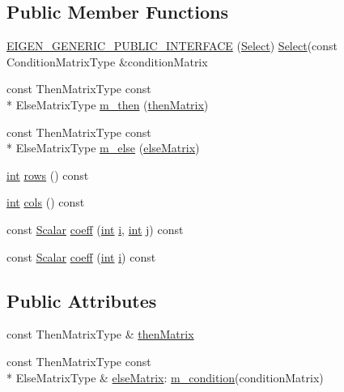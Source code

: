 \subsection*{Public Member Functions}
\begin{DoxyCompactItemize}
\item 
\hyperlink{class_select_a7ae8796960a285ca0e1d1ee9669eda49}{E\-I\-G\-E\-N\-\_\-\-G\-E\-N\-E\-R\-I\-C\-\_\-\-P\-U\-B\-L\-I\-C\-\_\-\-I\-N\-T\-E\-R\-F\-A\-C\-E} (\hyperlink{class_select}{Select}) \hyperlink{class_select}{Select}(const Condition\-Matrix\-Type \&condition\-Matrix
\item 
const Then\-Matrix\-Type const \\*
Else\-Matrix\-Type \hyperlink{class_select_a93d8185dc0454fbcf27269610ddb40f3}{m\-\_\-then} (\hyperlink{class_select_affc420bd5ce870ed1c16bc8f0bda2bbd}{then\-Matrix})
\item 
const Then\-Matrix\-Type const \\*
Else\-Matrix\-Type \hyperlink{class_select_a72311b3d569ba63864ec6c9601cbc126}{m\-\_\-else} (\hyperlink{class_select_a6a08fd64c3ed1e604c7870c814b0efbc}{else\-Matrix})
\item 
\hyperlink{ioapi_8h_a787fa3cf048117ba7123753c1e74fcd6}{int} \hyperlink{class_select_a8f21cd4b8d24fe8e1180ba911bf4e877}{rows} () const 
\item 
\hyperlink{ioapi_8h_a787fa3cf048117ba7123753c1e74fcd6}{int} \hyperlink{class_select_a06f43dbbfc15a77072a027da04bec69f}{cols} () const 
\item 
const \hyperlink{class_matrix_base_a625df8339dc2d816cbc0fd66e7dadaf5}{Scalar} \hyperlink{class_select_ae551b6e9af004f6772488b5d4c2defa7}{coeff} (\hyperlink{ioapi_8h_a787fa3cf048117ba7123753c1e74fcd6}{int} \hyperlink{uavobjecttemplate_8m_a6f6ccfcf58b31cb6412107d9d5281426}{i}, \hyperlink{ioapi_8h_a787fa3cf048117ba7123753c1e74fcd6}{int} j) const 
\item 
const \hyperlink{class_matrix_base_a625df8339dc2d816cbc0fd66e7dadaf5}{Scalar} \hyperlink{class_select_a58680e65ff3a8a308a7466ae86a1b604}{coeff} (\hyperlink{ioapi_8h_a787fa3cf048117ba7123753c1e74fcd6}{int} \hyperlink{uavobjecttemplate_8m_a6f6ccfcf58b31cb6412107d9d5281426}{i}) const 
\end{DoxyCompactItemize}
\subsection*{Public Attributes}
\begin{DoxyCompactItemize}
\item 
const Then\-Matrix\-Type \& \hyperlink{class_select_affc420bd5ce870ed1c16bc8f0bda2bbd}{then\-Matrix}
\item 
const Then\-Matrix\-Type const \\*
Else\-Matrix\-Type \& \hyperlink{class_select_a6a08fd64c3ed1e604c7870c814b0efbc}{else\-Matrix}\-: \hyperlink{class_select_ad35af17d4ed987f568e6e3446d9a2e63}{m\-\_\-condition}(condition\-Matrix)
\end{DoxyCompactItemize}

